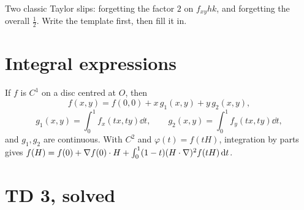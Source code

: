 \begin{trap}
Two classic Taylor slips: forgetting the factor $2$ on $f_{xy}hk$, and forgetting the overall
$\tfrac12$. Write the template first, then fill it in.
\end{trap}

\section{Integral expressions}

\begin{prop}
If $f$ is $C^1$ on a disc centred at $O$, then
\[ f(x,y)=f(0,0)+x\,g_1(x,y)+y\,g_2(x,y), \]
\[ g_1(x,y)=\int_0^1\!f_x(tx,ty)\dd t,\qquad g_2(x,y)=\int_0^1\!f_y(tx,ty)\dd t, \]
and $g_1,g_2$ are continuous. With $C^2$ and $\varphi(t)=f(tH)$, integration by parts gives
$f(H)=f(0)+\nabla f(0)\cdot H+\int_0^1(1-t)(H\cdot\nabla)^2f(tH)\,\mathrm{d} t$.
\end{prop}

\section{TD 3, solved}

